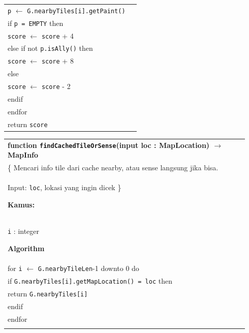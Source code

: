 \documentclass{article}
\newenvironment{pseudobox}
{
\centering
\begin{longtable}{|p{0.94\linewidth}|}
\hline
}
{
\\ \hline
\end{longtable}
\vspace{0.05cm}
}
\begin{document}
\begin{enumerate}[label=\alph*.]
\begin{enumerate}[label=\alph*.]
\begin{pseudobox}
\hspace*{3em}\texttt{p} $\leftarrow$ \texttt{G.nearbyTiles[i].getPaint()} \\
\hspace*{3em}if \texttt{p = EMPTY} then \\
\hspace*{4.5em}\texttt{score} $\leftarrow$ \texttt{score} + 4 \\
\hspace*{3em}else if not \texttt{p.isAlly()} then \\
\hspace*{4.5em}\texttt{score} $\leftarrow$ \texttt{score} + 8 \\
\hspace*{3em}else \\
\hspace*{4.5em}\texttt{score} $\leftarrow$ \texttt{score} - 2 \\
\hspace*{3em}endif \\
\hspace*{1.5em}endfor \\
\hspace*{1.5em}return \texttt{score}
\end{pseudobox}

\begin{pseudobox}
\textbf{function \texttt{findCachedTileOrSense}(input loc : MapLocation) $\rightarrow$ MapInfo} \\
\{ Mencari info tile dari cache nearby, atau sense langsung jika bisa. \\
Input: \texttt{loc}, lokasi yang ingin dicek
\}

\textbf{Kamus:} \\
\hspace*{1.5em}\texttt{i} : integer

\textbf{Algorithm} \\
\hspace*{1.5em}for \texttt{i} $\leftarrow$ \texttt{G.nearbyTileLen}-1 downto 0 do \\
\hspace*{3em}if \texttt{G.nearbyTiles[i].getMapLocation() = loc} then \\
\hspace*{4.5em}return \texttt{G.nearbyTiles[i]} \\
\hspace*{3em}endif \\
\hspace*{1.5em}endfor \\


\end{pseudobox}
\end{enumerate}
\end{enumerate}
\end{document}
